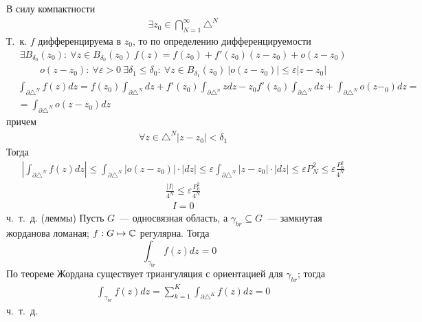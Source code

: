 В силу компактности
\begin{align*}
  & \exists z_0 \in \bigcap_{N=1}^{\infty}\triangle^N
\end{align*}
Т.~к. $f$ дифференцируема в $z_0$, то по определению дифференцируемости
\begin{align*}
  & \exists B_{\delta_0}(z_0): \ \forall z \in B_{\delta_0}(z_0) \ f(z) = f(z_0)+f'(z_0)(z-z_0) + o(z-z_0)
\end{align*}
\begin{align*}
  & o(z-z_0): \ \forall \varepsilon > 0 \ \exists \delta_1 \leq \delta_0: \ \forall z \in B_{\delta_1}(z_0) \ \left| o(z-z_0) \right| \leq \varepsilon\left| z-z_0 \right|
\end{align*}
\begin{align*}
  & \int_{\partial \triangle^N}f(z)dz = f(z_0)\int_{\partial \triangle^N}dz+f'(z_0)\int_{\partial \triangle^n}zdz - z_0 f'(z_0)\int_{\partial \triangle^N} dz + \int_{\partial \triangle^N}o(z-_0)dz = \\
  & = \int_{\partial \triangle^N}o(z-z_0)dz
\end{align*}
причем
\begin{align*}
  & \forall z \in \triangle^N \left| z-z_0 \right| < \delta_1
\end{align*}
Тогда
\begin{align*}
  & \left| \int_{\partial \triangle^N}f(z)dz \right| \leq \int_{\partial \triangle^N} \left| o(z-z_0) \right|\cdot \left| dz \right| \leq \varepsilon\int_{\partial\triangle^N}\left| z-z_0 \right|\cdot\left| dz \right| \leq \varepsilon P^2_N \leq \varepsilon \frac{P^2_0}{4^N}
\end{align*}
\begin{align*}
  & \frac{\left| I \right|}{4^N} \leq \varepsilon \frac{P^2_0}{4^N}
\end{align*}
\begin{align*}
  & I = 0
\end{align*}
ч.~т.~д.
\corollary (леммы)
Пусть $G$~--- односвязная область, а $\gamma_{br} \subseteq
G$~--- замкнутая жорданова ломаная; $f:G \mapsto \mathbb{C}$ регулярна. Тогда
\begin{equation} \label{(7.3)}
  \int_{\gamma_{br}} f(z)dz = 0
\end{equation}
\pr
По теореме Жордана существует триангуляция с ориентацией для $\gamma_{br}$;
тогда 
\begin{align*}
  & \int_{\gamma_{br}} f(z)dz = \sum_{k=1}^K\int_{\partial\triangle^K}f(z)dz = 0
\end{align*}
ч.~т.~д.
